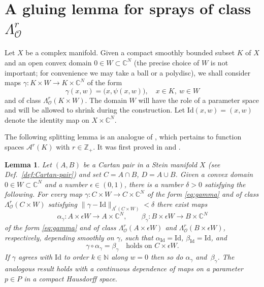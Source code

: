 \documentclass[11pt]{amsart}
\numberwithin{equation}{section}
\newtheorem{lemma}[theorem]{Lemma}
\theoremstyle{definition}
\newcommand\Ascr{\mathscr{A}}
\newcommand\Oscr{\mathscr{O}}
\newcommand\C{\mathbb{C}}
\newcommand\N{\mathbb{N}}
\newcommand\Z{\mathbb{Z}}
\newcommand\Id{\mathrm{Id}}
\begin{document}
%
%
%
%
\section{A gluing lemma for sprays of class 
$\Lambda^r_\Oscr$}\label{sec:gluing}

Let $X$ be a complex manifold. Given a compact 
smoothly bounded subset $K$ of $X$
and an open convex domain $0\in W\subset \C^N$ (the 
precise choice of $W$ is not important; for convenience
we may take a ball or a polydisc), we shall consider maps
$\gamma : K\times W\to K\times \C^N$ of the form
%
\begin{equation}\label{eq:gamma}
     \gamma(x,w) = \bigl(x,\psi(x,w)\bigl),\quad x\in K, \ w\in W
\end{equation}
and of class $\Lambda^r_\Oscr(K\times W)$. The domain $W$ 
will have the role of a parameter space and will be allowed  
to shrink during the construction. 
Let $\Id(x,w)=(x,w)$ denote the identity map on $X\times \C^N$. 

%
%
%
The following splitting lemma is an analogue of 
\cite[Proposition 5.8.1, p.\ 235]{Forstneric2017E}, 
which pertains to function spaces $\Ascr^r(K)$
with $r\in \Z_+$. It was first proved in 
\cite[Theorem 3.2]{DrinovecForstneric2008FM} 
and \cite[Lemma 3.2]{Forstneric2007AJM}.


\begin{lemma}\label{lem:splitting}
Let $(A,B)$ be a Cartan pair in a Stein manifold $X$ 
(see Def.\ \ref{def:Cartan-pair}) and set $C=A\cap B$, $D=A\cup B$. 
Given a convex domain 
$0\in W\subset\C^N$ and a number $\epsilon \in (0,1)$, 
there is a number $\delta>0$ satisfying the following.
For every map $\gamma : C\times W \to C\times \C^N$
of the form \eqref{eq:gamma} and of class 
$\Lambda^r_\Oscr(C\times W)$ satisfying
$\|\gamma-\Id\|_{\Lambda^r(C\times W)}<\delta$ 
there exist maps
\begin{equation}\label{eq:alphabeta}
 	 \alpha_\gamma : A \times \epsilon W \to A\times \C^N, \qquad
 	 \beta_\gamma :  B \times \epsilon W \to B \times \C^N
\end{equation}
of the form \eqref{eq:gamma} and of class
$\Lambda^r_\Oscr(A\times \epsilon W)$ and 
$\Lambda^r_\Oscr(B\times \epsilon W)$, respectively, 
depending smoothly on $\gamma$,
such that $\alpha_{\Id}=\Id$, $\beta_{\Id}=\Id$, and
\begin{equation}\label{eq:splitspray}
   \gamma\circ\alpha_\gamma = \beta_\gamma
   \quad \text{holds on $C\times \epsilon W$.}
\end{equation}
If $\gamma$ agrees with $\Id$ to order $k\in\N$ along $w=0$
then so do $\alpha_\gamma$ and~$\beta_\gamma$.
The analogous result holds with a continuous dependence
of maps on a parameter $p\in P$ in a compact Hausdorff space.
\end{lemma}
\end{document}
